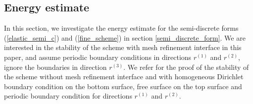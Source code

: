 \subsection{Energy estimate}
In this section, we investigate the energy estimate for the semi-discrete forms (\ref{elastic_semi_c}) and (\ref{fine_scheme}) in section \ref{semi_discrete_form}. We are interested in the stability of the scheme with mesh refinement interface in this paper, and assume periodic boundary conditions in directions $r^{(1)}$ and $r^{(2)}$, ignore the boundaries in direction $r^{(3)}$. We refer \cite{petersson2015wave} for the proof of the stability of the scheme without mesh refinement interface and with homogeneous Dirichlet boundary condition on the bottom surface, free surface on the top surface and periodic boundary condition for directions $r^{(1)}$ and $r^{(2)}$.

